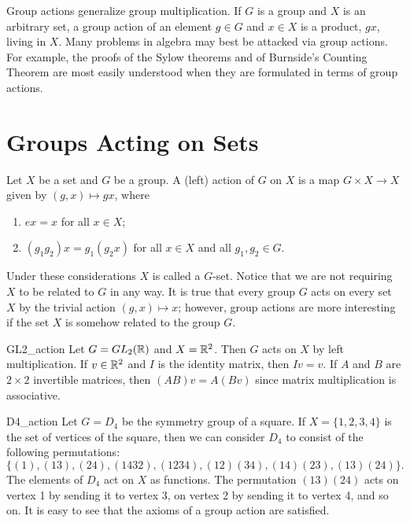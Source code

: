 
Group actions generalize group multiplication.  If $G$ is a group and $X$ is an arbitrary set, a group action of an element $g \in G$ and $x \in X$ is a product, $gx$,  living in $X$.  Many problems in algebra may best be attacked via group actions.  For example, the proofs of the Sylow theorems and of Burnside's Counting Theorem are most easily understood when they are formulated in terms of group actions. 


\section{Groups Acting on Sets}

Let $X$ be a set and $G$ be a group.  A  {\bfi (left) action\/} of $G$ on $X$ is a map $G \times X \rightarrow X$ given by $(g,x) \mapsto gx$, where 
\begin{enumerate}
 
\item 
$ex = x$ for all $x \in X$;
 
\item 
$(g_1 g_2)x = g_1(g_2 x)$ for all $x \in X$ and all $g_1, g_2 \in G$. 
 
\end{enumerate}
Under these considerations $X$ is called a {\bfi $G$-set}.  Notice that we are not requiring $X$ to be related to $G$ in any way.  It is true that every group $G$ acts on every set $X$ by the trivial action $(g,x) \mapsto x$; however, group actions are more interesting if the set $X$ is somehow related to the group $G$. 

\begin{example}{GL2_action}
Let $G = GL_2( {\Bbb R} )$ and $X = {\Bbb R}^2$. Then $G$ acts on $X$ by left multiplication.  If $v \in {\Bbb R}^2$ and $I$ is the identity matrix, then $Iv = v$.  If $A$ and $B$ are $2 \times 2$ invertible matrices, then $(AB)v = A(Bv)$ since matrix multiplication is
associative. 
\end{example}

\begin{example}{D4_action}
Let $G = D_4$ be the symmetry group of a square.  If $X = \{ 1, 2, 3, 4 \}$ is the set of vertices of the square, then we can consider $D_4$
to consist of the following permutations: 
\[
\{ (1), (13), (24), (1432), (1234), (12)(34), (14)(23), (13)(24) \}.
\]
The elements of $D_4$ act on $X$ as functions.  The permutation $(13)(24)$ acts on vertex 1 by sending it to vertex 3, on vertex 2 by
sending it to vertex 4, and so on.  It is easy to see that the  axioms of a group action are satisfied.
\mbox{\hspace{1in}}
\end{example}



